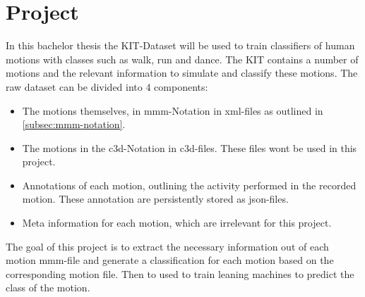 \chapter{Project}
In this bachelor thesis the KIT-Dataset\cite{Plappert2016} will be used to train classifiers of human motions with classes such as walk, run and dance. The KIT contains a number of motions and the relevant information to simulate and classify these motions. The raw dataset can be divided into 4 components:
\begin{itemize}
	\item The motions themselves, in mmm-Notation in xml-files as outlined in \ref{subsec:mmm-notation}.
	\item The motions in the c3d-Notation in c3d-files. These files wont be used in this project.
	\item Annotations of each motion, outlining the activity performed in the recorded motion. These annotation are persistently stored as json-files.
	\item Meta information for each motion, which are irrelevant for this project.
\end{itemize}
The goal of this project is to extract the necessary information out of each motion mmm-file and generate a classification for each motion based on the corresponding motion file. Then to used to train leaning machines to predict the class of the motion.
